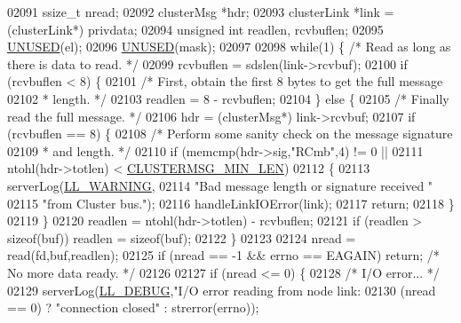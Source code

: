 \begin{DoxyCode}
{{{{{{{{{{{{{{{{{{{{{{{{{{{{{{{{{{{{{02091     ssize\_t nread;
02092     clusterMsg *hdr;
02093     clusterLink *link = (clusterLink*) privdata;
02094     \textcolor{keywordtype}{unsigned} \textcolor{keywordtype}{int} readlen, rcvbuflen;
02095     \hyperlink{server_8h_ae7c9dc8f13568a9c856573751f1ee1ec}{UNUSED}(el);
02096     \hyperlink{server_8h_ae7c9dc8f13568a9c856573751f1ee1ec}{UNUSED}(mask);
02097 
02098     \textcolor{keywordflow}{while}(1) \{ \textcolor{comment}{/* Read as long as there is data to read. */}
02099         rcvbuflen = sdslen(link->rcvbuf);
02100         \textcolor{keywordflow}{if} (rcvbuflen < 8) \{
02101             \textcolor{comment}{/* First, obtain the first 8 bytes to get the full message}
02102 \textcolor{comment}{             * length. */}
02103             readlen = 8 - rcvbuflen;
02104         \} \textcolor{keywordflow}{else} \{
02105             \textcolor{comment}{/* Finally read the full message. */}
02106             hdr = (clusterMsg*) link->rcvbuf;
02107             \textcolor{keywordflow}{if} (rcvbuflen == 8) \{
02108                 \textcolor{comment}{/* Perform some sanity check on the message signature}
02109 \textcolor{comment}{                 * and length. */}
02110                 \textcolor{keywordflow}{if} (memcmp(hdr->sig,\textcolor{stringliteral}{"RCmb"},4) != 0 ||
02111                     ntohl(hdr->totlen) < \hyperlink{cluster_8h_a92c33a8bb7f8a960845347ca63c4659e}{CLUSTERMSG\_MIN\_LEN})
02112                 \{
02113                     serverLog(\hyperlink{server_8h_a31229b9334bba7d6be2a72970967a14b}{LL\_WARNING},
02114                         \textcolor{stringliteral}{"Bad message length or signature received "}
02115                         \textcolor{stringliteral}{"from Cluster bus."});
02116                     handleLinkIOError(link);
02117                     \textcolor{keywordflow}{return};
02118                 \}
02119             \}
02120             readlen = ntohl(hdr->totlen) - rcvbuflen;
02121             \textcolor{keywordflow}{if} (readlen > \textcolor{keyword}{sizeof}(buf)) readlen = \textcolor{keyword}{sizeof}(buf);
02122         \}
02123 
02124         nread = read(fd,buf,readlen);
02125         \textcolor{keywordflow}{if} (nread == -1 && errno == EAGAIN) \textcolor{keywordflow}{return}; \textcolor{comment}{/* No more data ready. */}
02126 
02127         \textcolor{keywordflow}{if} (nread <= 0) \{
02128             \textcolor{comment}{/* I/O error... */}
02129             serverLog(\hyperlink{server_8h_abcaffe365dee628fcf9fc90c69d534a1}{LL\_DEBUG},\textcolor{stringliteral}{"I/O error reading from node link: %
02130                 (nread == 0) ? \textcolor{stringliteral}{"connection closed"} : strerror(errno));
}}}}}}}}}}}}}}}}}}}}}}}}}}}}}}}}}}}}}}
\end{DoxyCode}
